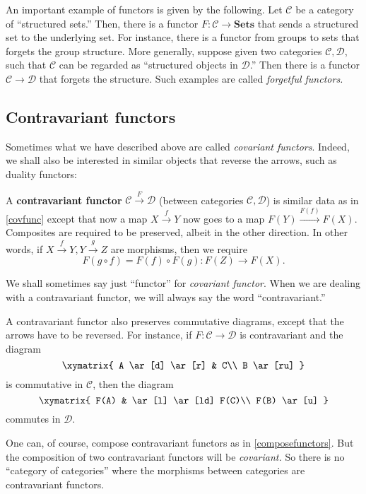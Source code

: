 An important example of functors is given by the following. Let $\mathcal{C}$
be a category of ``structured sets.'' Then, there is a functor $F: \mathcal{C}
\to \textbf{Sets}$ that sends  a structured set to the underlying set. For
instance, there is a functor from groups to sets that forgets the group
structure.
More generally, suppose given two categories $\mathcal{C}, \mathcal{D}$, such
that $\mathcal{C}$ can be regarded as ``structured objects in $\mathcal{D}$.''
Then there is a functor $\mathcal{C} \to \mathcal{D}$ that forgets the
structure.
Such examples are called \emph{forgetful functors.}

\subsection{Contravariant functors}
Sometimes what we have described above are called \textit{covariant functors}.
Indeed, we shall also be interested in similar objects that reverse the
arrows, such as duality functors:

\begin{definition}
A \textbf{contravariant functor}  $\mathcal{C}
\stackrel{F}{\to}\mathcal{D}$ (between categories $\mathcal{C}, \mathcal{D}$)
is similar
data as in \cref{covfunc} except that now a map $X \stackrel{f}{\to} Y$ now
goes to a map $F(Y)
\stackrel{F(f)}{\to} F(X)$. Composites
are required to be preserved, albeit in the other direction.
In other words, if $X \stackrel{f}{\to} Y, Y \stackrel{g}{\to} Z$ are
morphisms, then we require
\[ F ( g \circ f) = F(f) \circ F(g): F(Z) \to F(X).  \]
\end{definition}

We shall sometimes  say just ``functor'' for \emph{covariant functor}. When we are
dealing with a contravariant functor, we will always say the word
``contravariant.''


A contravariant functor also preserves commutative diagrams, except that the
arrows have to be reversed. For instance, if $F: \mathcal{C} \to \mathcal{D}$
is contravariant and the diagram
\[ \xymatrix{
A \ar[d] \ar[r] &  C\\
B \ar[ru]
}\]
is commutative in $\mathcal{C}$, then the diagram
\[ \xymatrix{
F(A)   & \ar[l] \ar[ld] F(C)\\
F(B) \ar[u]
}\]
commutes in $\mathcal{D}$.

One can, of course, compose contravariant functors as in \cref{composefunctors}. But the composition of two
contravariant functors will be \emph{covariant.} So there is no ``category of
categories'' where the morphisms between categories are contravariant functors. 

